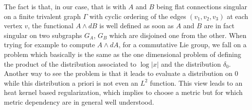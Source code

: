 \documentclass[10pt]{article}
\begin{document}









The fact is that, in our case, that is with $A$ and $B$ being flat connections singular on a finite trivalent graph $\Gamma$ with cyclic ordering of the edges $(v_1,v_2,v_3)$ at each vertex $v$, the functional  $A\wedge dB$ is well defined as soon as $A$ and $B$ are in fact singular on two subgraphs $G_A$, $G_B$ which are disjoined one from the other. When trying for example to compute $A\wedge dA$, for a commutative Lie group, we fall on a problem which basically is the same as the one dimensional problem of defining the product of the distribution associated to $\log |x|$ and the distribution $\delta_0$. Another way to see the problem is that it leads to evaluate a distribution on 0 while this distribution a priori is not even an $L^2$ function. This view leads to an heat kernel based regularization, which implies to choose a metric but for which metric dependency are in general well understood.
\end{document}
